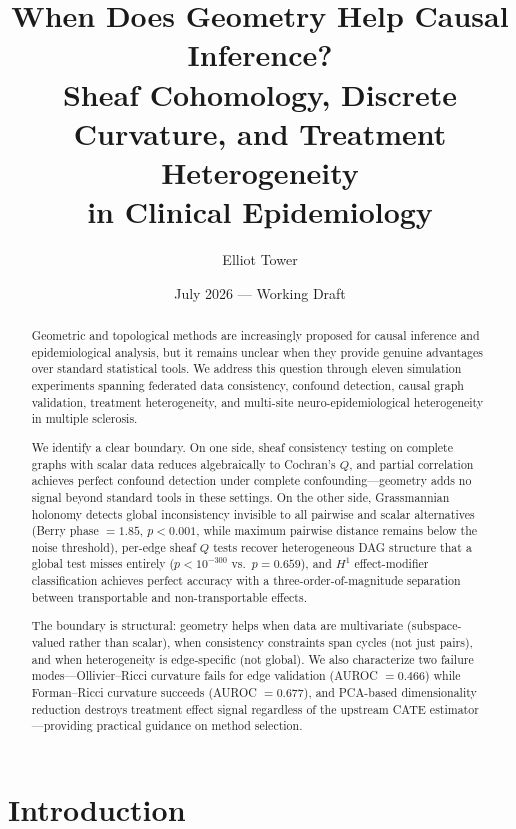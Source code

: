 \documentclass[11pt]{article}
\title{When Does Geometry Help Causal Inference?\\
Sheaf Cohomology, Discrete Curvature, and Treatment Heterogeneity\\
in Clinical Epidemiology}
\author{
Elliot Tower
}
\date{July 2026 --- Working Draft}
\begin{document}
\maketitle

\begin{abstract}
Geometric and topological methods are increasingly proposed for causal inference and epidemiological analysis, but it remains unclear when they provide genuine advantages over standard statistical tools.
We address this question through eleven simulation experiments spanning federated data consistency, confound detection, causal graph validation, treatment heterogeneity, and multi-site neuro-epidemiological heterogeneity in multiple sclerosis.

We identify a clear boundary.
On one side, sheaf consistency testing on complete graphs with scalar data reduces algebraically to Cochran's $Q$, and partial correlation achieves perfect confound detection under complete confounding---geometry adds no signal beyond standard tools in these settings.
On the other side, Grassmannian holonomy detects global inconsistency invisible to all pairwise and scalar alternatives (Berry phase $= 1.85$, $p < 0.001$, while maximum pairwise distance remains below the noise threshold), per-edge sheaf $Q$ tests recover heterogeneous DAG structure that a global test misses entirely ($p < 10^{-300}$ vs.\ $p = 0.659$), and $H^1$ effect-modifier classification achieves perfect accuracy with a three-order-of-magnitude separation between transportable and non-transportable effects.

The boundary is structural: geometry helps when data are multivariate (subspace-valued rather than scalar), when consistency constraints span cycles (not just pairs), and when heterogeneity is edge-specific (not global).
We also characterize two failure modes---Ollivier--Ricci curvature fails for edge validation (AUROC $= 0.466$) while Forman--Ricci curvature succeeds (AUROC $= 0.677$), and PCA-based dimensionality reduction destroys treatment effect signal regardless of the upstream CATE estimator---providing practical guidance on method selection.
\end{abstract}

\section{Introduction}
\label{sec:intro}
\end{document}
